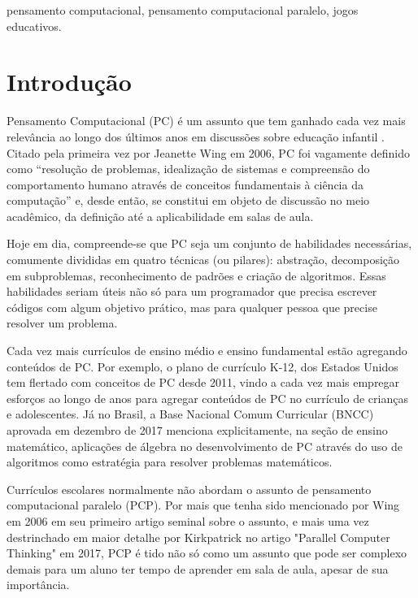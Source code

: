 \documentclass[conference]{IEEEtran}
\begin{document}
\renewcommand{\IEEEkeywordsname}{Palavras-Chave}
\begin{IEEEkeywords}
pensamento computacional, pensamento computacional paralelo, jogos educativos.
\end{IEEEkeywords}

\section{Introdução}

Pensamento Computacional (PC) é um assunto que tem ganhado cada vez mais relevância ao longo dos últimos anos em discussões sobre educação infantil \cite{b1}. Citado pela primeira vez por Jeanette Wing em 2006, PC foi vagamente definido como “resolução de problemas, idealização de sistemas e compreensão do comportamento humano através de conceitos fundamentais à ciência da computação”\cite{b2} e, desde então, se constitui em objeto de discussão no meio acadêmico, da definição até a aplicabilidade em salas de aula.

Hoje em dia, compreende-se que PC seja um conjunto de habilidades necessárias, comumente divididas em quatro técnicas (ou pilares): abstração, decomposição em subproblemas, reconhecimento de padrões e criação de algoritmos\cite{b3}. Essas habilidades seriam úteis não só para um programador que precisa escrever códigos com algum objetivo prático, mas para qualquer pessoa que precise resolver um problema.

Cada vez mais currículos de ensino médio e ensino fundamental estão agregando conteúdos de PC. Por exemplo, o plano de currículo K-12, dos Estados Unidos tem flertado com conceitos de PC desde 2011\cite{b1}, vindo a cada vez mais empregar esforços ao longo de anos para agregar conteúdos de PC no currículo de crianças e adolescentes. Já no Brasil, a Base Nacional Comum Curricular (BNCC) aprovada em dezembro de 2017 menciona explicitamente, na seção de ensino matemático, aplicações de álgebra no desenvolvimento de PC através do uso de algoritmos como estratégia para resolver problemas matemáticos\cite{b4}.

Currículos escolares normalmente não abordam o assunto de pensamento computacional paralelo (PCP). Por mais que tenha sido mencionado por Wing em 2006 em seu primeiro artigo seminal sobre o assunto, e mais uma vez destrinchado em maior detalhe por Kirkpatrick no artigo "Parallel Computer Thinking" em 2017, PCP é tido não só como um assunto que pode ser complexo demais para um aluno ter tempo de aprender em sala de aula, apesar de sua importância\cite{b5}. 
\end{document}
